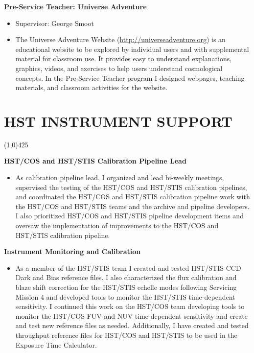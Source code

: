 \documentclass{res}
\begin{document}
\begin{resume}
   {\bf Pre-Service Teacher: Universe Adventure}
   		\begin{itemize}
   		\item[] Supervisor: George Smoot
		\item[] The Universe Adventure Website ({\color{blue}\url{http://universeadventure.org}}) is an educational website to be explored by individual users and with supplemental material for classroom use. It provides easy to understand explanations, graphics, videos, and exercises to help users understand cosmological concepts. In the Pre-Service Teacher program I designed webpages, teaching materials, and classroom activities for the website.
		\end{itemize}

\section{HST INSTRUMENT SUPPORT} 
\vspace{-.2in}
\begin{center}
\line(1,0){425}
\end{center}
\vspace{-.3in}
\vspace{0.1in}

	{\bf HST/COS and HST/STIS Calibration Pipeline Lead}
		\begin{itemize}
		\item[]  As calibration pipeline lead, I organized and lead bi-weekly meetings, supervised the testing of the HST/COS and HST/STIS calibration pipelines, and coordinated the HST/COS and HST/STIS calibration pipeline work with the HST/COS and HST/STIS teams and the archive and pipeline developers. I also prioritized HST/COS and HST/STIS pipeline development items and oversaw the implementation of improvements to the HST/COS and HST/STIS calibration pipeline.
		\end{itemize}


   {\bf  Instrument Monitoring and Calibration}
        \begin{itemize}
        \item[]  As a member of the HST/STIS team I created and tested HST/STIS CCD Dark and Bias reference files. I also characterized the flux calibration and blaze shift correction for the HST/STIS echelle modes following Servicing Mission 4 and developed tools to monitor the HST/STIS time-dependent sensitivity. I continued this work on the HST/COS team developing tools to monitor the HST/COS FUV and NUV time-dependent sensitivity and create and test new reference files as needed. Additionally, I have created and tested throughput reference files for HST/COS and HST/STIS to be used in the Exposure Time Calculator.
		\end{itemize}
		

\end{resume}
\end{document}
